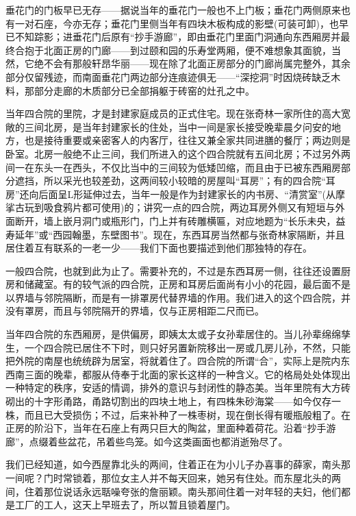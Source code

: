 \par 垂花门的门板早已无存——据说当年的垂花门一般也不上门板；垂花门两侧原来也有一对石座，今亦无存；垂花门里侧当年有四块木板构成的影壁(可装可卸)，也早已不知踪影；进垂花门后原有“抄手游廊”，即由垂花门里面门洞通向东西厢房并最终合抱于北面正房的门廊——到过颐和园的乐寿堂两厢，便不难想象其面貌，当然，它绝不会有那般轩昂华丽——现在除了北面正房部分的门廊尚属完整外，其余部分仅留残迹，而南面垂花门两边部分连痕迹俱无——“深挖洞”时因烧砖缺乏木料，那部分走廊的木质部分已全部捐躯于砖窑的灶孔之中。
\par 当年四合院的里院，才是封建家庭成员的正式住宅。现在张奇林一家所住的高大宽敞的三间北房，是当年封建家长的住处，当中一间是家长接受晚辈晨夕问安的地方，也是接待重要或亲密客人的内客厅，往往又兼全家共同进膳的餐厅；两边则是卧室。北房一般绝不止三间，我们所进入的这个四合院就有五间北房；不过另外两间一在东头一在西头，不仅比当中的三间较为低矮凹缩，而且由于已被东西厢房部分遮挡，所以采光也较差劲，这两间较小较暗的房屋叫“耳房”；有的四合院“耳房”还向后面呈L形延伸过去，当年一般是作为封建家长的内书房、“清赏室”(从摩挲古玩到吸食鸦片都可使用)的；讲究一点的四合院，两边耳房外侧又有短垣与外面断开，墙上嵌月洞门或瓶形门，门上并有砖雕横匾，对应地题为“长乐未央，益寿延年”或“西园翰墨，东壁图书”。现在，东西耳房当然都与张奇林家隔断，并且居住着互有联系的一老一少——我们下面也要描述到他们那独特的存在。
\par 一般四合院，也就到此为止了。需要补充的，不过是东西耳房一侧，往往还设置厨房和储藏室。有的较气派的四合院，正房和耳房后面尚有小小的花园，最后面不是以界墙与邻院隔断，而是有一排罩房代替界墙的作用。我们进入的这个四合院，并没有罩房，而且与邻院隔开的界墙，仅与正房相距二尺而已。
\par 当年四合院的东西厢房，是供偏房，即姨太太或子女孙辈居住的。当儿孙辈绵绵孳生，一个四合院已居住不下时，则只好另置新院移出一房或几房儿孙，不然，只能把外院的南屋也统统辟为居室，将就着住了。四合院的所谓“合”，实际上是院内东西南三面的晚辈，都服从侍奉于北面的家长这样的一种含义。它的格局处处体现出一种特定的秩序，安适的情调，排外的意识与封闭性的静态美。当年里院有大方砖砌出的十字形甬路，甬路切割出的四块土地上，有四株朱砂海棠——如今仅存一株，而且已大受损伤；不过，后来补种了一株枣树，现在倒长得有暖瓶般粗了。在正房的阶沿下，当年在石座上有两只巨大的陶盆，里面种着荷花。沿着“抄手游廊”，点缀着些盆花，吊着些鸟笼。如今这类画面也都消逝殆尽了。
\par 我们已经知道，如今西屋靠北头的两间，住着正在为小儿子办喜事的薛家，南头那一间呢？门时常锁着，那位女主人并不每天回来，她另有住处。而东屋北头的两间，住着那位说话永远聒噪夸张的詹丽颖。南头那间住着一对年轻的夫妇，他们都是工厂的工人，这天上早班去了，所以暂且锁着屋门。
